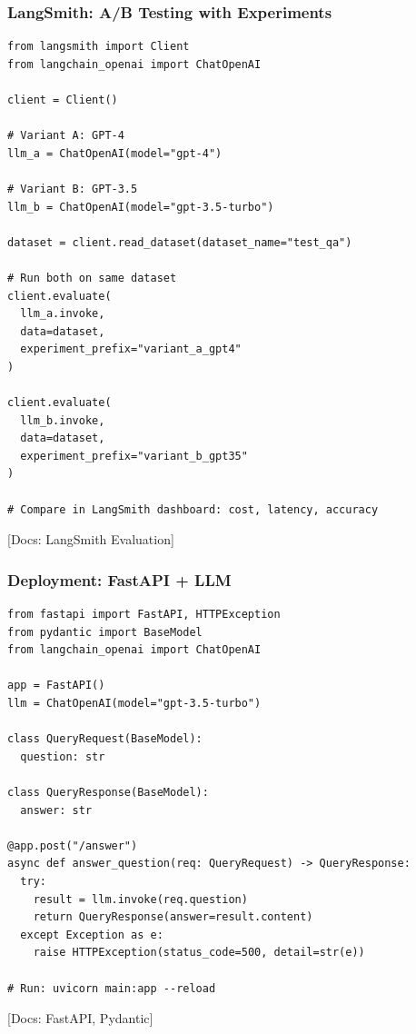 \documentclass[aspectratio=169,11pt]{beamer}
\newcommand{\docref}[1]{{\scriptsize\color{docgray}[Docs: #1]}}
\begin{document}
\begin{frame}[fragile,shrink=12]
\frametitle{LangSmith: A/B Testing with Experiments}
\vspace{-0.3cm}

\begin{lstlisting}
from langsmith import Client
from langchain_openai import ChatOpenAI

client = Client()

# Variant A: GPT-4
llm_a = ChatOpenAI(model="gpt-4")

# Variant B: GPT-3.5
llm_b = ChatOpenAI(model="gpt-3.5-turbo")

dataset = client.read_dataset(dataset_name="test_qa")

# Run both on same dataset
client.evaluate(
  llm_a.invoke,
  data=dataset,
  experiment_prefix="variant_a_gpt4"
)

client.evaluate(
  llm_b.invoke,
  data=dataset,
  experiment_prefix="variant_b_gpt35"
)

# Compare in LangSmith dashboard: cost, latency, accuracy
\end{lstlisting}

\docref{LangSmith Evaluation}

\end{frame}

\begin{frame}[fragile,shrink=8]
\frametitle{Deployment: FastAPI + LLM}

\begin{lstlisting}
from fastapi import FastAPI, HTTPException
from pydantic import BaseModel
from langchain_openai import ChatOpenAI

app = FastAPI()
llm = ChatOpenAI(model="gpt-3.5-turbo")

class QueryRequest(BaseModel):
  question: str

class QueryResponse(BaseModel):
  answer: str

@app.post("/answer")
async def answer_question(req: QueryRequest) -> QueryResponse:
  try:
    result = llm.invoke(req.question)
    return QueryResponse(answer=result.content)
  except Exception as e:
    raise HTTPException(status_code=500, detail=str(e))

# Run: uvicorn main:app --reload
\end{lstlisting}

\docref{FastAPI, Pydantic}

\end{frame}
\end{document}
